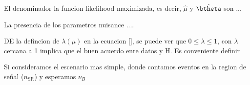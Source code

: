 El denominador la funcion likelihood maximizada, es decir, $\hat{\mu}$ y $\hat{\btheta}$ son ...

La presencia de los parametros nuisance ....


DE la defincion de $\lambda(\mu)$ en la ecuacion \ref{}, se puede ver que $0 \leq \lambda \leq 1$,
con $\lambda$ cercana a 1 implica que el buen acuerdo enre datos y H. Es conveniente definir


Si consideramos el escenario mas simple, donde contamos eventos en la region de se\~nal
($n_\text{SR}$) y esperamos $\nu_B$















